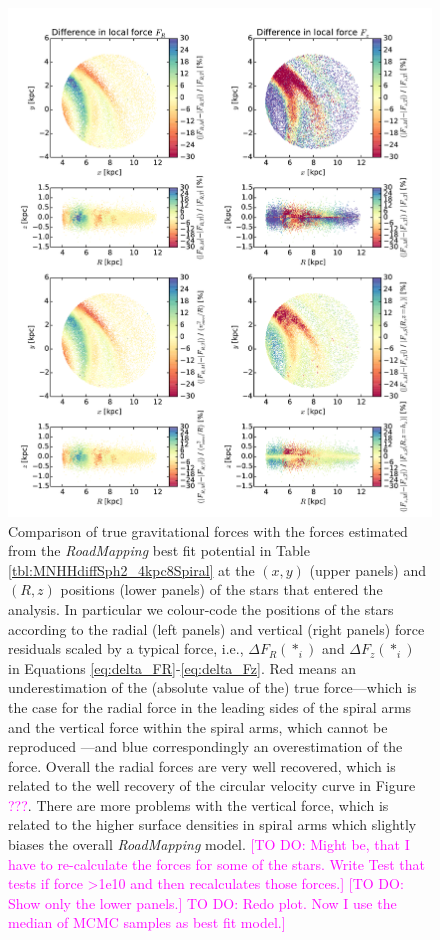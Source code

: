 \documentclass[iop,revtex4,numberedappendix,appendixfloats]{emulateapj}
\newcommand{\RM}{{\sl RoadMapping}}
\newcommand{\Wilma}[1]{\textcolor{Magenta}{#1}}
\begin{document}
\begin{figure}[!htbp]
\centering
\includegraphics[width=\columnwidth]{fig/MNdHHdiffSph2_4kpc8Spiral_a_test1_forces_overview_5.pdf}
\caption{Comparison of true gravitational forces with the forces estimated from the \RM{} best fit potential in Table \ref{tbl:MNHHdiffSph2_4kpc8Spiral} at the $(x,y)$ (upper panels) and $(R,z)$ positions (lower panels) of the stars that entered the analysis. In particular we colour-code the positions of the stars according to the radial (left panels) and vertical (right panels) force residuals scaled by a typical force, i.e., $\Delta F_R(*_i)$ and $\Delta F_z(*_i)$ in Equations \eqref{eq:delta_FR}-\eqref{eq:delta_Fz}. Red means an underestimation of the (absolute value of the)  true force---which is the case for the radial force in the leading sides of the spiral arms and the vertical force within the spiral arms, which cannot be reproduced ---and blue correspondingly an overestimation of the force. Overall the radial forces are very well recovered, which is related to the well recovery of the circular velocity curve in Figure \Wilma{???}. There are more problems with the vertical force, which is related to the higher surface densities in spiral arms which slightly biases the overall \RM{} model. \Wilma{[TO DO: Might be, that I have to re-calculate the forces for some of the stars. Write Test that tests if force >1e10 and then recalculates those forces.]} \Wilma{[TO DO: Show only the lower panels.]} \Wilma{TO DO: Redo plot. Now I use the median of MCMC samples as best fit model.]}}
\label{fig:4kpc8Spiral_forces}
\end{figure}
\end{document}
